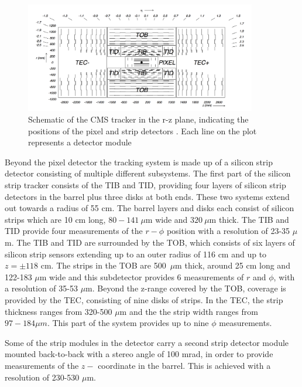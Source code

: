 \begin{figure}[h!]
\begin{center}
\includegraphics[width=0.9\textwidth]{./Detector/Plots/Tracker.png}
\caption{Schematic of the CMS tracker in the r-z plane, indicating the
positions of the pixel and strip detectors \cite{cms-jinst}. Each line 
on the plot represents a detector module}
\label{fig:CMS_tracker}
\end{center}
\end{figure}


Beyond the pixel detector the tracking system is made up of a silicon
strip detector consisting of multiple different subsystems. The first part of the
silicon strip tracker consists of the \ac{TIB} and \ac{TID}, providing four layers of
silicon strip detectors in the barrel plus three disks at both ends. These two systems
extend out towards a radius of 55 cm. The barrel layers and disks each consist
of silicon strips which are 10 cm long, $80-141~\mu$m wide and $320~\mu$m thick. The \ac{TIB} and \ac{TID}
provide four measurements of the $r-\phi$ position  with a resolution of 23-35 $\mu$m.
The \ac{TIB} and \ac{TID} are surrounded by the \ac{TOB}, which consists of six layers of silicon strip sensors extending
up to an outer radius of 116 cm and up to $z=\pm 118$ cm. The strips in the \ac{TOB} are 500~$\mu$m thick, around 25 cm long and 122-183 $\mu$m 
wide and this subdetector provides 6 measurements of $r$ and $\phi$, with a resolution
of 35-53 $\mu$m. Beyond the z-range covered by the \ac{TOB}, coverage is provided by the \ac{TEC},
consisting of nine disks of strips. In the \ac{TEC}, the strip thickness ranges from 320-500 $\mu$m and the the strip width ranges from $97-184 \mu m$.
This part of the system provides up to nine $\phi$ measurements.

Some of the strip modules in the detector carry a second strip detector module mounted back-to-back with a stereo angle %
of 100 mrad, in order to provide measurements of the $z-$ coordinate in the barrel. This is achieved with a resolution of 230-530 $\mu$m.

